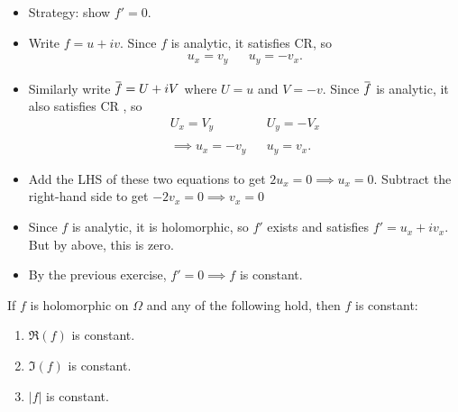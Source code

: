 \begin{solution}

\envlist

\begin{itemize}
\item
  Strategy: show \(f'=0\).
\item
  Write \(f = u + iv\). Since \(f\) is analytic, it satisfies CR, so
  \begin{align*}
  u_x = v_y && u_y = -v_x
  .\end{align*}
\item
  Similarly write
  \(\mkern 1.5mu\overline{\mkern-1.5muf\mkern-1.5mu}\mkern 1.5mu = U + iV\)
  where \(U = u\) and \(V = -v\). Since
  \(\mkern 1.5mu\overline{\mkern-1.5muf\mkern-1.5mu}\mkern 1.5mu\) is
  analytic, it also satisfies CR , so
  \begin{align*}
  U_x = V_y && U_y = -V_x \\ \\
  \implies u_x = -v_y && u_y = v_x
  .\end{align*}
\item
  Add the LHS of these two equations to get
  \(2u_x = 0 \implies u_x = 0\). Subtract the right-hand side to get
  \(-2v_x = 0 \implies v_x = 0\)
\item
  Since \(f\) is analytic, it is holomorphic, so \(f'\) exists and
  satisfies \(f' = u_x + iv_x\). But by above, this is zero.
\item
  By the previous exercise, \(f'=0 \implies f\) is constant.
\end{itemize}

\end{solution}

\begin{exercise}

If \(f\) is holomorphic on \(\Omega\) and any of the following hold,
then \(f\) is constant:

\begin{enumerate}
\def\labelenumi{\arabic{enumi}.}
\tightlist
\item
  \(\Re(f)\) is constant.
\item
  \(\Im(f)\) is constant.
\item
  \({\left\lvert {f} \right\rvert}\) is constant.
\end{enumerate}

\end{exercise}

